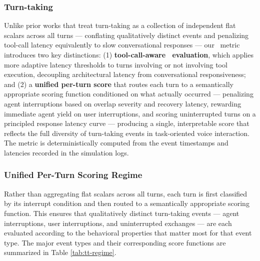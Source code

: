 \subsubsection{Turn-taking}
\label{app:turn-taking}
Unlike prior works \citep{ray2026tauvoicebenchmarkingfullduplexvoice, lin2026full}  that treat turn-taking as a collection of independent flat scalars across all turns — conflating qualitatively distinct events and penalizing tool-call latency equivalently to slow conversational responses — our \metricturntaking~metric introduces two key distinctions: (1) \textbf{tool-call-aware \metricturntaking~evaluation}, which applies more adaptive latency thresholds to turns involving  or not involving tool execution, decoupling architectural latency from conversational responsiveness; and (2) a \textbf{unified per-turn score} that routes each turn to a semantically appropriate scoring function conditioned on what actually occurred — penalizing agent interruptions based on overlap severity and recovery latency, rewarding immediate agent yield on user interruptions, and scoring uninterrupted turns on a principled response latency curve — producing a single, interpretable score that reflects the full diversity of turn-taking events in task-oriented voice interaction. The metric is deterministically computed from the event timestamps and latencies recorded in the simulation logs.

\subsubsection*{Unified Per-Turn Scoring Regime}
\label{app:turn-taking-scoring-regime}
Rather than aggregating flat scalars across all turns, each turn is first classified by its interrupt condition and then routed to a semantically appropriate scoring function. This ensures that qualitatively distinct turn-taking events — agent interruptions, user interruptions, and uninterrupted exchanges — are each evaluated according to the behavioral properties that matter most for that event type. The major event types and their corresponding score functions are summarized in Table \ref{tab:tt-regime}.


